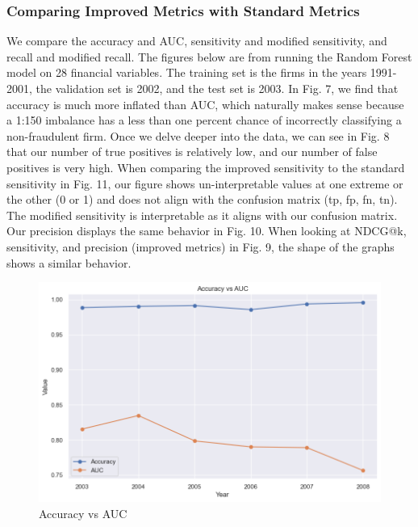 \documentclass[conference]{IEEEtran}
\begin{document}
	\subsubsection{Comparing Improved Metrics with Standard Metrics} We compare the accuracy and AUC, sensitivity and modified sensitivity, and recall and modified recall. The figures below are from running the Random Forest model on 28 financial variables. The training set is the firms in the years 1991-2001, the validation set is 2002, and the test set is 2003. In Fig. 7, we find that accuracy is much more inflated than AUC, which naturally makes sense because a 1:150 imbalance has a less than one percent chance of incorrectly classifying a non-fraudulent firm. Once we delve deeper into the data, we can see in Fig. 8 that our number of true positives is relatively low, and our number of false positives is very high. When comparing the improved sensitivity to the standard sensitivity in Fig. 11, our figure shows un-interpretable values at one extreme or the other (0 or 1) and does not align with the confusion matrix (tp, fp, fn, tn). The modified sensitivity is interpretable as it aligns with our confusion matrix. Our precision displays the same behavior in Fig. 10. \newline\indent When looking at NDCG@k, sensitivity, and precision (improved metrics) in Fig. 9, the shape of the graphs shows a similar behavior. \vspace{15pt}
	\begin{figure}[H]
	\centerline{\includegraphics[width=\columnwidth]{output}}
	\caption{Accuracy vs AUC}
	\label{fig}
	\end{figure} \vspace{15pt}
\end{document}
